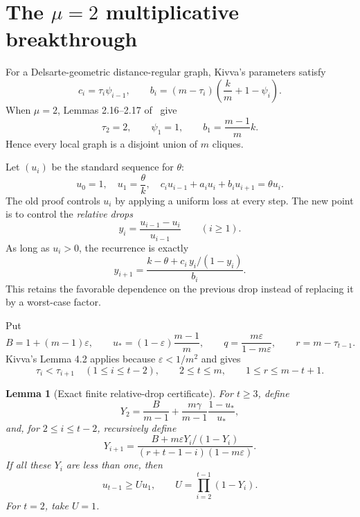 \documentclass[11pt]{amsart}
\newtheorem{lemma}[theorem]{Lemma}
\theoremstyle{definition}
\newcommand{\eps}{\varepsilon}
\newcommand{\gam}{\gamma}
\begin{document}
\section{The $\mu=2$ multiplicative breakthrough}\label{sec:mu2}
For a Delsarte-geometric distance-regular graph, Kivva's parameters satisfy~\cite[Lemma 2.16]{Kivva}
\begin{equation}\label{eq:geom}
 c_i=\tau_i\psi_{i-1},\qquad
 b_i=(m-\tau_i)\left(\frac{k}{m}+1-\psi_i\right).
\end{equation}
When $\mu=2$, Lemmas 2.16--2.17 of~\cite{Kivva} give
\begin{equation}\label{eq:mu2params}
 \tau_2=2,\qquad \psi_1=1,
 \qquad b_1=\frac{m-1}{m}k.
\end{equation}
Hence every local graph is a disjoint union of $m$ cliques.

Let $(u_i)$ be the standard sequence for $\theta$:
\begin{equation}\label{eq:standard}
 u_0=1,\quad u_1=\frac\theta k,
 \quad c_i u_{i-1}+a_i u_i+b_i u_{i+1}=\theta u_i.
\end{equation}
The old proof controls $u_i$ by applying a uniform loss at every step.  The new point is to control the \emph{relative drops}
\begin{equation}\label{eq:ydef}
 y_i=\frac{u_{i-1}-u_i}{u_{i-1}}\qquad(i\ge1).
\end{equation}
As long as $u_i>0$, the recurrence is exactly
\begin{equation}\label{eq:riccati}
 y_{i+1}=\frac{k-\theta+c_i\,y_i/(1-y_i)}{b_i}.
\end{equation}
This retains the favorable dependence on the previous drop instead of replacing it by a worst-case factor.

Put
\begin{equation}\label{eq:mu2defs}
 B=1+(m-1)\eps,
 \qquad u_*=(1-\eps)\frac{m-1}{m},
 \qquad q=\frac{m\eps}{1-m\eps},
 \qquad r=m-\tau_{t-1}.
\end{equation}
Kivva's Lemma 4.2 applies because $\eps<1/m^2$ and gives
\begin{equation}\label{eq:taugrowth}
 \tau_i<\tau_{i+1}\quad(1\le i\le t-2),
 \qquad 2\le t\le m,
 \qquad 1\le r\le m-t+1.
\end{equation}

\begin{lemma}[Exact finite relative-drop certificate]\label{lem:finiteY}
For $t\ge3$, define
\begin{equation}\label{eq:Y2}
 Y_2=\frac{B}{m-1}
 +\frac{m\gam}{m-1}\frac{1-u_*}{u_*},
\end{equation}
and, for $2\le i\le t-2$, recursively define
\begin{equation}\label{eq:Yrec}
 Y_{i+1}=\frac{B+m\eps Y_i/(1-Y_i)}
 {(r+t-1-i)(1-m\eps)}.
\end{equation}
If all these $Y_i$ are less than one, then
\begin{equation}\label{eq:Ubound}
 u_{t-1}\ge Uu_1,
 \qquad
 U=\prod_{i=2}^{t-1}(1-Y_i).
\end{equation}
For $t=2$, take $U=1$.
\end{lemma}
\end{document}
